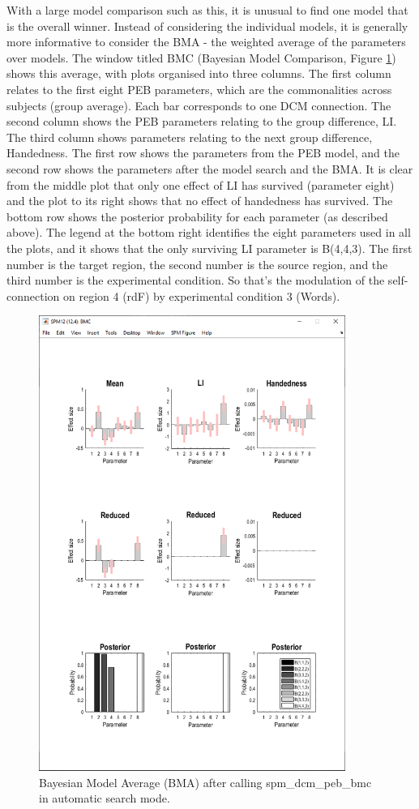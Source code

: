 \documentclass{article}
\begin{document}
With a large model comparison such as this, it is unusual to find one model that is the overall winner. Instead of considering the individual models, it is generally more informative to consider the BMA - the weighted average of the parameters over models. The window titled BMC (Bayesian Model Comparison, Figure \ref{Fig_peb_search_part2}) shows this average, with plots organised into three columns. The first column relates to the first eight PEB parameters, which are the commonalities across subjects (group average). Each bar corresponds to one DCM connection. The second column shows the PEB parameters relating to the group difference, LI. The third column shows parameters relating to the next group difference, Handedness. The first row shows the parameters from the PEB model, and the second row shows the parameters after the model search and the BMA. It is clear from the middle plot that only one effect of LI has survived (parameter eight) and the plot to its right shows that no effect of handedness has survived. The bottom row shows the posterior probability for each parameter (as described above). The legend at the bottom right identifies the eight parameters used in all the plots, and it shows that the only surviving LI parameter is B(4,4,3). The first number is the target region, the second number is the source region, and the third number is the experimental condition. So that's the modulation of the self-connection on region 4 (rdF) by experimental condition 3 (Words).

\begin{figure}[ht]
\begin{center}
\includegraphics[width=10cm]{"Fig_peb_search_part2"}
\caption{Bayesian Model Average (BMA) after calling spm\_dcm\_peb\_bmc in automatic search mode.\label{Fig_peb_search_part2}}
\end{center}
\end{figure}
\end{document}
